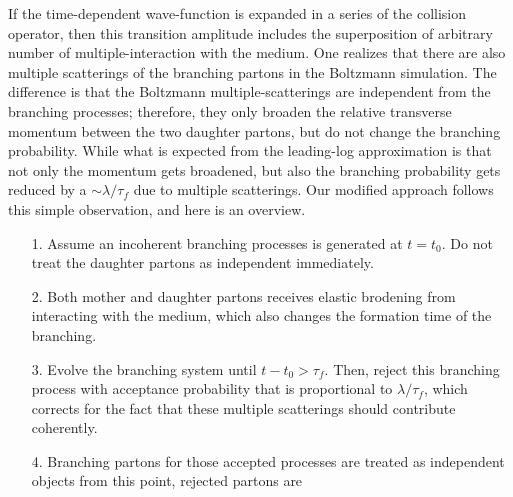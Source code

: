 If the time-dependent wave-function is expanded in a series of the collision operator, then this transition amplitude includes the superposition of arbitrary number of multiple-interaction with the medium.
One realizes that there are also multiple scatterings of the branching partons in the Boltzmann simulation.
The difference is that the Boltzmann multiple-scatterings are independent from the branching processes; therefore, they only broaden the relative transverse momentum between the two daughter partons, but do not change the branching probability.
While what is expected from the leading-log approximation is that not only the momentum gets broadened, but also the branching probability gets reduced by a $\sim \lambda/\tau_f$ due to multiple scatterings.
Our modified approach follows this simple observation, and here is an overview.
\begin{itemize}
\item[1.] Assume an incoherent branching processes is generated at $t=t_0$. Do not treat the daughter partons as independent immediately.
\item[2.] Both mother and daughter partons receives elastic brodening from interacting with the medium, which also changes the formation time of the branching.
\item[3.] Evolve the branching system until $t-t_0 > \tau_f$. Then, reject this branching process with acceptance probability that is proportional to $\lambda/\tau_f$, which corrects for the fact that these multiple scatterings should contribute coherently.
\item[4.] Branching partons for those accepted processes are treated as independent objects from this point, rejected partons are
\end{itemize}

